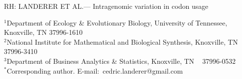 \documentclass[12pt]{article}
\begin{document}
\doublespacing
\linenumbers

\newcommand{\kluyveri}{\emph{L. kluyveri}\xspace}
\newcommand{\Lklu}{\emph{L. kluyveri}\xspace}
\newcommand{\Klu}{\Lklu}
\newcommand{\LKlu}{\Lklu}
\newcommand{\dubl}{\emph{C. dubliniensis}\xspace}
\newcommand{\gossypii}{\emph{E. gossypii}\xspace}
\newcommand{\ROC}{ROC SEMPPR\xspace}
\newcommand{\GC}{GC content\xspace}
\newcommand{\DM}{\ensuremath{{\Delta M}}\xspace}
\newcommand{\DE}{\ensuremath{{\Delta \eta}}\xspace}
\newcommand{\Ne}{\ensuremath{N_e}\xspace}
\newcommand{\Lik}{\ensuremath{\mathcal{L}}\xspace}
\newcommand{\LLik}{\ensuremath{\text{\emph{L}}}\xspace}

\newcommand{\beginsupplement}{%
  \setcounter{section}{19} %
  \setcounter{page}{1}
  \renewcommand{\thepage}{S\arabic{page}} %

  \setcounter{table}{0}
  \renewcommand{\thetable}{S\arabic{table}}%
  \setcounter{figure}{0}
  \renewcommand{\thefigure}{S\arabic{figure}}%
}

\noindent RH: LANDERER ET AL.--- Intragenomic variation in codon usage
\bigskip
\medskip
\begin{center}

\bigskip





\end{center}

\vfill

{\small
\noindent$^{1}$Department of Ecology \& Evolutionary Biology, University of Tennessee, Knoxville, TN 37996-1610\\
\noindent$^{2}$National Institute for Mathematical and Biological Synthesis, Knoxville, TN 37996-3410\\
\noindent$^{3}$Department of Business Analytics \& Statistics, Knoxville, TN ~ 37996-0532 \\
\noindent$^{*}$Corresponding author. E-mail:~cedric.landerer@gmail.com
}
\end{document}
